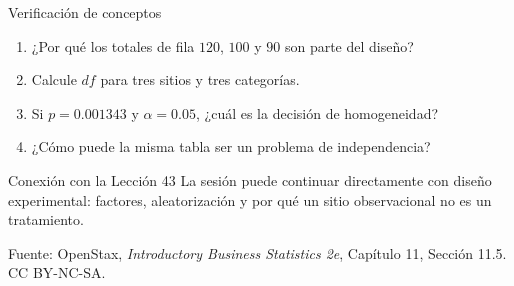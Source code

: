 \documentclass[aspectratio=169,10pt,spanish]{beamer}
\begin{document}
\begin{frame}{Verificación de conceptos}
  \begin{enumerate}
    \item ¿Por qué los totales de fila $120$, $100$ y $90$ son parte del
      diseño?
    \item Calcule $df$ para tres sitios y tres categorías.
    \item Si $p=0.001343$ y $\alpha=0.05$, ¿cuál es la decisión de
      homogeneidad?
    \item ¿Cómo puede la misma tabla ser un problema de independencia?
  \end{enumerate}

  \vspace{0.6em}
  \begin{block}{Conexión con la Lección 43}
    La sesión puede continuar directamente con diseño experimental:
    factores, aleatorización y por qué un sitio observacional no es un
    tratamiento.
  \end{block}

  \vfill
  \scriptsize Fuente: OpenStax, \textit{Introductory Business Statistics 2e},
  Capítulo 11, Sección 11.5. CC BY-NC-SA.
\end{frame}

\appendix
\end{document}
